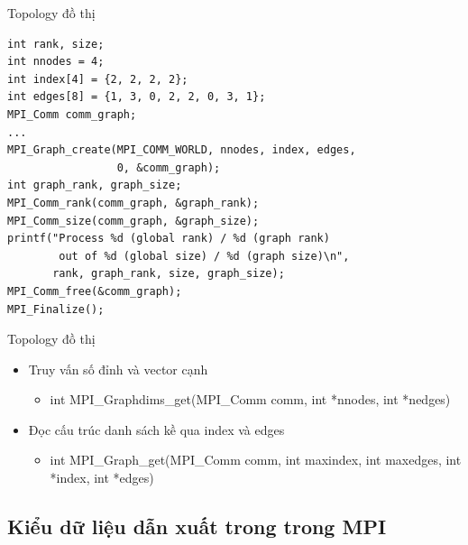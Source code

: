 \documentclass[10pt]{beamer}
\theoremstyle{remark}
\numberwithin{algocf}{section}
\numberwithin{equation}{section}
\numberwithin{dl}{section}
\numberwithin{figure}{section}
\begin{document}
\begin{frame}[fragile]{Topology đồ thị}
    \begin{verbatim}
int rank, size;
int nnodes = 4;
int index[4] = {2, 2, 2, 2};
int edges[8] = {1, 3, 0, 2, 2, 0, 3, 1};
MPI_Comm comm_graph;
...
MPI_Graph_create(MPI_COMM_WORLD, nnodes, index, edges, 
                 0, &comm_graph);
int graph_rank, graph_size;
MPI_Comm_rank(comm_graph, &graph_rank);
MPI_Comm_size(comm_graph, &graph_size);
printf("Process %d (global rank) / %d (graph rank) 
        out of %d (global size) / %d (graph size)\n",
       rank, graph_rank, size, graph_size);
MPI_Comm_free(&comm_graph);
MPI_Finalize();
    \end{verbatim}
\end{frame}

\begin{frame}{Topology đồ thị}
    \begin{itemize}
        \item Truy vấn số đỉnh và vector cạnh
        \begin{itemize}
            \item int MPI\_Graphdims\_get(MPI\_Comm comm, int *nnodes,
                                         int *nedges)
        \end{itemize}
        \item Đọc cấu trúc danh sách kề qua index và edges
        \begin{itemize}
            \item int MPI\_Graph\_get(MPI\_Comm comm, int maxindex,
                                      int maxedges, int *index,
                                      int *edges)
        \end{itemize}
    \end{itemize}
\end{frame}

\subsection{Kiểu dữ liệu dẫn xuất trong trong MPI}
\end{document}
